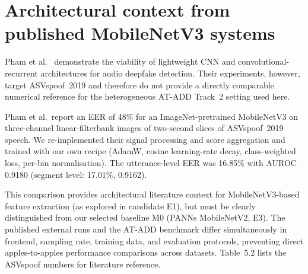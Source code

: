 \documentclass[12pt,a4paper]{report}
\begin{document}
\section{Architectural context from published MobileNetV3 systems}

Pham et al.~\cite{pham2024deepfake} demonstrate the viability of lightweight CNN and convolutional-recurrent architectures for audio deepfake detection. Their experiments, however, target ASVspoof~2019 and therefore do not provide a directly comparable numerical reference for the heterogeneous AT-ADD Track~2 setting used here.

Pham et al.\ report an EER of 48\% for an ImageNet-pretrained MobileNetV3 on three-channel linear-filterbank images of two-second slices of ASVspoof~2019 speech. We re-implemented their signal processing and score aggregation and trained with our own recipe (AdamW, cosine learning-rate decay, class-weighted loss, per-bin normalisation). The utterance-level EER was 16.85\% with AUROC 0.9180 (segment level: 17.01\%, 0.9162). 

This comparison provides architectural literature context for MobileNetV3-based feature extraction (as explored in candidate E1), but must be clearly distinguished from our selected baseline M0 (PANNs MobileNetV2, E3). The published external runs and the AT-ADD benchmark differ simultaneously in frontend, sampling rate, training data, and evaluation protocols, preventing direct apples-to-apples performance comparisons across datasets. Table~5.2 lists the ASVspoof numbers for literature reference.
\end{document}
